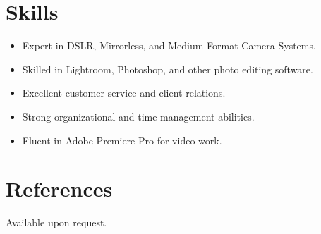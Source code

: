 \documentclass[12pt]{article}
\begin{document}
\section{Skills}
\begin{itemize}
    \item Expert in DSLR, Mirrorless, and Medium Format Camera Systems.
    \item Skilled in Lightroom, Photoshop, and other photo editing software.
    \item Excellent customer service and client relations.
    \item Strong organizational and time-management abilities.
    \item Fluent in Adobe Premiere Pro for video work.
\end{itemize}

\section*{References}
Available upon request.
\end{document}
